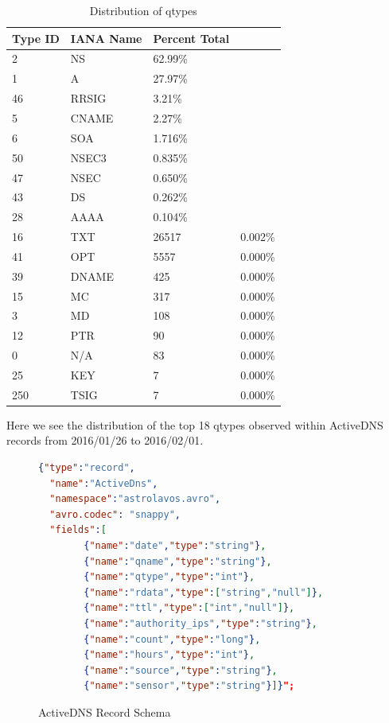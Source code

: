 \documentclass{acm_proc_article-sp}
\begin{document}
\begin{table}[h]
\centering
\caption{Distribution of qtypes}
\begin{tabular}{ |p{1.7cm}||p{1.7cm}|p{1.7cm}|p{1.7cm}|  }
\hline
 \hline
 {\bf Type ID}& {\bf IANA Name} & {\bf Percent Total}\\
 \hline
 2 & NS &  62.99\% \\
 \hline
 1 & A &  27.97\% \\
 \hline
 46 & RRSIG & 3.21\% \\
 \hline
 5 & CNAME &  2.27\% \\
 \hline
 6 & SOA &   1.716\% \\
 \hline
 50 & NSEC3 &  0.835\% \\
 \hline
 47 & NSEC &  0.650\% \\
 \hline
 43 & DS &  0.262\% \\
 \hline
 28 & AAAA&  0.104\% \\
 \hline
 16 & TXT& 26517& 0.002\% \\
 \hline
 41 & OPT& 5557& 0.000\% \\
 \hline
 39 & DNAME& 425& 0.000\% \\
 \hline
 15 & MC& 317& 0.000\% \\
 \hline
 3 & MD& 108& 0.000\% \\
 \hline
 12 & PTR& 90& 0.000\% \\
 \hline
 0 & N/A& 83 & 0.000\% \\
 \hline
 25 & KEY & 7 & 0.000\% \\
 \hline
 250 & TSIG & 7 & 0.000\% \\
\hline
\end{tabular}
\vspace{2mm}
Here we see the distribution of the top 18 qtypes observed within ActiveDNS records from 2016/01/26 to 2016/02/01.

\label{table:1}
\end{table}


\begin{figure}
\begin{lstlisting}[language=json,firstnumber=1]
{"type":"record",
  "name":"ActiveDns",
  "namespace":"astrolavos.avro",
  "avro.codec": "snappy",
  "fields":[
        {"name":"date","type":"string"},
        {"name":"qname","type":"string"},
        {"name":"qtype","type":"int"},
        {"name":"rdata","type":["string","null"]},
        {"name":"ttl","type":["int","null"]},
        {"name":"authority_ips","type":"string"},
        {"name":"count","type":"long"},
        {"name":"hours","type":"int"},
        {"name":"source","type":"string"},
        {"name":"sensor","type":"string"}]}";
\end{lstlisting}
\caption{ActiveDNS Record Schema}
\label{fig:my_label}
\end{figure}
\end{document}
